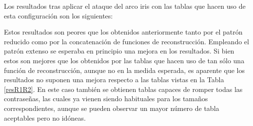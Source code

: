 \documentclass[12pt,spanish,listoffigures,listoftables]{tfgetsinf}
\begin{document}
Los resultados tras aplicar el ataque del arco iris con las tablas que hacen uso de esta configuración son los siguientes:

\def\arraystretch{1.5}
\begin{table}[H]
	\LARGE
	\centering
	\caption{Porcentajes de éxito para las tablas empleando el patrón extenso}
	\label{resPG}
\end{table}

Estos resultados son peores que los obtenidos anteriormente tanto por el patrón reducido como por la concatenación de funciones de reconstrucción. Empleando el patrón extenso se esperaba en principio una mejora en los resultados. Si bien estos son mejores que los obtenidos por las tablas que hacen uso de tan sólo una función de reconstrucción, aunque no en la medida esperada, es aparente que los resultados no suponen una mejora respecto a las tablas vistas en la Tabla \ref{resR1R2}. En este caso también se obtienen tablas capaces de romper todas las contraseñas, las cuales ya vienen siendo habituales para los tamaños correspondientes, aunque se pueden observar un mayor número de tabla aceptables pero no idóneas.
\end{document}
